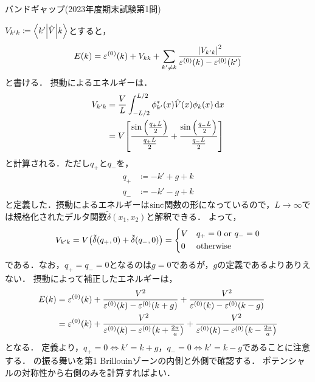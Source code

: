 \documentclass{report}
\begin{document}
\begin{myex}{バンドギャップ(2023年度期末試験第1問)}{}
\begin{enumerate}
        $V_{k'k} \coloneqq \mel**{k'}{\hat{V}}{k}$とすると，
        \begin{align}
          E(k) = \varepsilon^{(0)}(k) + V_{kk} + \sum_{k'\neq k}\frac{\abs{V_{k'k}}^2}{\varepsilon^{(0)}(k) - \varepsilon^{(0)}(k')}
        \end{align}
        と書ける．
        摂動によるエネルギーは．
        \begin{align}
          V_{k'k} &= \frac{V}{L}\int_{-L/2}^{L/2}\phi_{k'}^{*}(x)\hat{V}(x)\phi_k(x)\dd{x} \\
          &= V\qty[\frac{\sin\qty(\frac{q_+L}{2})}{\frac{q_+L}{2}} + \frac{\sin\qty(\frac{q_-L}{2})}{\frac{q_-L}{2}}] 
        \end{align}
        と計算される．ただし$q_+$と$q_-$を，
        \begin{align}
          q_+ &\coloneqq -k' + g + k \\ 
          q_- &\coloneqq -k' - g + k
        \end{align}
        と定義した．摂動によるエネルギーは$\mathrm{sinc}$関数の形になっているので，$L\to\infty$では規格化されたデルタ関数$\tilde{\delta}(x_1, x_2)$と解釈できる．
        よって，
        \begin{align}
          V_{k'k} = V\qty(\tilde{\delta}(q_+, 0) + \tilde{\delta}(q_-, 0)) = 
          \begin{dcases}
            V & q_+ = 0\ \mathrm{or}\ q_- = 0\\
            0 & \mathrm{otherwise}
          \end{dcases}
        \end{align}
        である．なお，$q_+ = q_- = 0$となるのは$g = 0$であるが，$g$の定義であるよりありえない．
        摂動によって補正したエネルギーは，
        \begin{align}
          E(k) &= \varepsilon^{(0)}(k) + \frac{V^2}{\varepsilon^{(0)}(k) - \varepsilon^{(0)}(k + g)} + \frac{V^2}{\varepsilon^{(0)}(k) - \varepsilon^{(0)}(k - g)} \\ 
          &= \varepsilon^{(0)}(k) + \frac{V^2}{\varepsilon^{(0)}(k) - \varepsilon^{(0)}\qty(k + \frac{2\pi}{a})} + \frac{V^2}{\varepsilon^{(0)}(k) - \varepsilon^{(0)}\qty(k - \frac{2\pi}{a})}\label{2nd-order-perturbation-eigenvalue-in-electron}
        \end{align}
        となる．
        定義より，$q_+ = 0 \Leftrightarrow k' = k + g$，$q_- = 0 \Leftrightarrow k' = k - g$であることに注意する．
        の振る舞いを第1 Brillouinゾーンの内側と外側で確認する．
        ポテンシャルの対称性から右側のみを計算すればよい．

\end{enumerate}
\end{myex}
\end{document}

